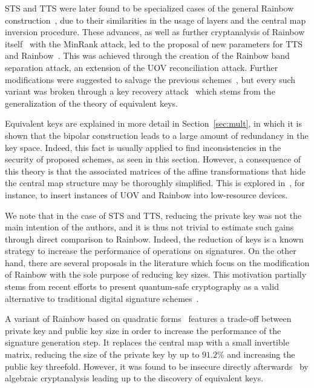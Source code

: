 \documentclass[12pt, a4paper, oneside]{memoir}
\theoremstyle{definition}
\begin{document}
STS and TTS were later found to be specialized cases of the general Rainbow construction~\cite{Ding:200806}, due to their similarities in the usage of layers and the central map inversion procedure. These advances, as well as further cryptanalysis of Rainbow itself~\cite{Billet:200609} with the MinRank attack, led to the proposal of new parameters for TTS and Rainbow~\cite{Ding:200806}. This was achieved through the creation of the Rainbow band separation attack, an extension of the UOV reconciliation attack. Further modifications were suggested to salvage the previous schemes~\cite{Tsujii:201005}, but every such variant was broken through a key recovery attack~\cite{Thomae:201207} which stems from the generalization of the theory of equivalent keys.

Equivalent keys are explained in more detail in Section~\ref{sec:mult}, in which it is shown that the bipolar construction leads to a large amount of redundancy in the key space. Indeed, this fact is usually applied to find inconsistencies in the security of proposed schemes, as seen in this section. However, a consequence of this theory is that the associated matrices of the affine transformations that hide the central map structure may be thoroughly simplified. This is explored in~\cite{Czypek:201209}, for instance, to insert instances of UOV and Rainbow into low-resource devices.

We note that in the case of STS and TTS, reducing the private key was not the main intention of the authors, and it is thus not trivial to estimate such gains through direct comparison to Rainbow. Indeed, the reduction of keys is a known strategy to increase the performance of operations on signatures. On the other hand, there are several proposals in the literature which focus on the modification of Rainbow with the sole purpose of reducing key sizes. This motivation partially stems from recent efforts to present quantum-safe cryptography as a valid alternative to traditional digital signature schemes~\cite{Bernstein:2008}.

A variant of Rainbow based on quadratic forms~\cite{Yasuda:201306} features a trade-off between private key and public key size in order to increase the performance of the signature generation step. It replaces the central map with a small invertible matrix, reducing the size of the private key by up to $91.2\%$ and increasing the public key threefold. However, it was found to be insecure directly afterwards~\cite{Hashimoto:201410} by algebraic cryptanalysis leading up to the discovery of equivalent keys.
\end{document}
